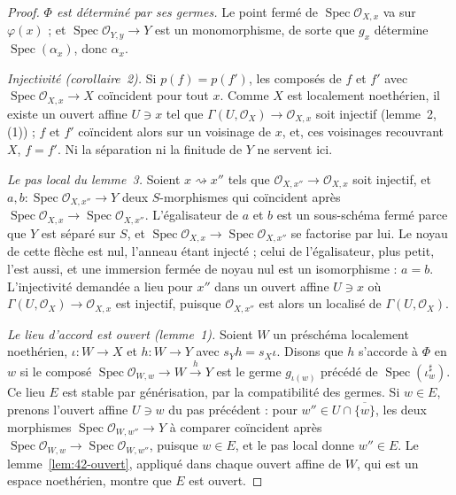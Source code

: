 \begin{proof}
\emph{$\Phi$ est déterminé par ses germes.} Le point fermé de $\operatorname{Spec} \mathcal O_{X,x}$ va sur $\varphi(x)$ ; et $\operatorname{Spec} \mathcal O_{Y,y} \to Y$ est un monomorphisme, de sorte que $g_x$ détermine $\operatorname{Spec}(\alpha_x)$, donc $\alpha_x$.

\emph{Injectivité (corollaire~2).} Si $p(f) = p(f')$, les composés de $f$ et $f'$ avec $\operatorname{Spec} \mathcal O_{X,x} \to X$ coïncident pour tout $x$. Comme $X$ est localement noethérien, il existe un ouvert affine $U \ni x$ tel que $\Gamma(U, \mathcal O_X) \to \mathcal O_{X,x}$ soit injectif (lemme~2, (1)) ; $f$ et $f'$ coïncident alors sur un voisinage de $x$, et, ces voisinages recouvrant $X$, $f = f'$. Ni la séparation ni la finitude de $Y$ ne servent ici.

\emph{Le pas local du lemme~3.} Soient $x \rightsquigarrow x''$ tels que $\mathcal O_{X,x''} \to \mathcal O_{X,x}$ soit injectif, et $a, b : \operatorname{Spec} \mathcal O_{X,x''} \to Y$ deux $S$-morphismes qui coïncident après $\operatorname{Spec} \mathcal O_{X,x} \to \operatorname{Spec} \mathcal O_{X,x''}$. L'égalisateur de $a$ et $b$ est un sous-schéma fermé parce que $Y$ est séparé sur $S$, et $\operatorname{Spec} \mathcal O_{X,x} \to \operatorname{Spec} \mathcal O_{X,x''}$ se factorise par lui. Le noyau de cette flèche est nul, l'anneau étant injecté ; celui de l'égalisateur, plus petit, l'est aussi, et une immersion fermée de noyau nul est un isomorphisme : $a = b$. L'injectivité demandée a lieu pour $x''$ dans un ouvert affine $U \ni x$ où $\Gamma(U, \mathcal O_X) \to \mathcal O_{X,x}$ est injectif, puisque $\mathcal O_{X,x''}$ est alors un localisé de $\Gamma(U, \mathcal O_X)$.

\emph{Le lieu d'accord est ouvert (lemme~1).} Soient $W$ un préschéma localement noethérien, $\iota : W \to X$ et $h : W \to Y$ avec $s_Y h = s_X \iota$. Disons que $h$ s'accorde à $\Phi$ en $w$ si le composé $\operatorname{Spec} \mathcal O_{W,w} \to W \xrightarrow{h} Y$ est le germe $g_{\iota(w)}$ précédé de $\operatorname{Spec}(\iota^\sharp_w)$. Ce lieu $E$ est stable par générisation, par la compatibilité des germes. Si $w \in E$, prenons l'ouvert affine $U \ni w$ du pas précédent : pour $w'' \in U \cap \overline{\{w\}}$, les deux morphismes $\operatorname{Spec} \mathcal O_{W,w''} \to Y$ à comparer coïncident après $\operatorname{Spec} \mathcal O_{W,w} \to \operatorname{Spec} \mathcal O_{W,w''}$, puisque $w \in E$, et le pas local donne $w'' \in E$. Le lemme~\ref{lem:42-ouvert}, appliqué dans chaque ouvert affine de $W$, qui est un espace noethérien, montre que $E$ est ouvert.


\end{proof}
